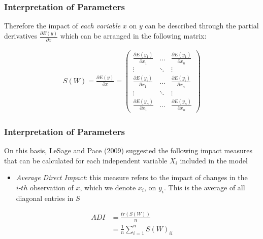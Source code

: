 \documentclass[
  shownotes,
  xcolor={svgnames},
  hyperref={colorlinks,citecolor=DarkBlue,linkcolor=DarkRed,urlcolor=DarkBlue}
  , aspectratio=169]{beamer}
\begin{document}
\begin{frame}
\frametitle{Interpretation of Parameters}
Therefore the impact of {\it each variable}  $x$ on $y$ can be described through the partial derivatives $\frac{\partial E(y)}{\partial x}$ which can be arranged in the following matrix:

\bigskip

\begin{align}
S(W)=\frac{\partial E(y)}{\partial x}=\left(\begin{array}{ccc}
\frac{\partial E(y_{1})}{\partial x_{1}} & \dots & \frac{\partial E(y_{1})}{\partial x_{n}}\\
\vdots & \ddots & \vdots\\
\frac{\partial E(y_{i})}{\partial x_{1}} & \dots & \frac{\partial E(y_{i})}{\partial x_{n}}\\ 
\vdots & \ddots & \vdots\\
\frac{\partial E(y_{n})}{\partial x_{1}} & \dots & \frac{\partial E(y_{n})}{\partial x_{n}}
\end{array}\right)
\end{align}




\end{frame}
\begin{frame}
\frametitle{Interpretation of Parameters}
On this basis, LeSage and Pace (2009) suggested the following impact measures that can be calculated for each independent variable $X_i$ included in the model 

\begin{itemize}
\item {\it Average Direct Impact}: this measure refers to the impact of changes in the $i‐th$ observation of $x$, which we denote $x_{i}$, on $y_i$. This is the average of all diagonal entries in $S$
\end{itemize}

\begin{align}
ADI &= \frac{tr(S(W))}{n} \nonumber \\
&= \frac{1}{n}\sum_{i=1}^n S(W)_{ii}
\end{align}


\end{frame}
\end{document}
